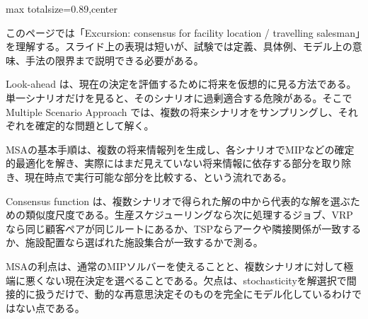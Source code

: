 \begin{minipage}[t]{0.58\textwidth}
\begin{adjustbox}{max totalsize={\textwidth}{0.89\textheight},center}
\begin{minipage}{\textwidth}\scriptsize
{}このページでは「Excursion: consensus for facility location / travelling salesman」を理解する。スライド上の表現は短いが、試験では定義、具体例、モデル上の意味、手法の限界まで説明できる必要がある。\par
Look-ahead は、現在の決定を評価するために将来を仮想的に見る方法である。単一シナリオだけを見ると、そのシナリオに過剰適合する危険がある。そこで Multiple Scenario Approach では、複数の将来シナリオをサンプリングし、それぞれを確定的な問題として解く。\par
MSAの基本手順は、複数の将来情報列を生成し、各シナリオでMIPなどの確定的最適化を解き、実際にはまだ見えていない将来情報に依存する部分を取り除き、現在時点で実行可能な部分を比較する、という流れである。\par
Consensus function は、複数シナリオで得られた解の中から代表的な解を選ぶための類似度尺度である。生産スケジューリングなら次に処理するジョブ、VRPなら同じ顧客ペアが同じルートにあるか、TSPならアークや隣接関係が一致するか、施設配置なら選ばれた施設集合が一致するかで測る。\par
MSAの利点は、通常のMIPソルバーを使えることと、複数シナリオに対して極端に悪くない現在決定を選べることである。欠点は、stochasticityを解選択で間接的に扱うだけで、動的な再意思決定そのものを完全にモデル化しているわけではない点である。\par

\end{minipage}
\end{adjustbox}
\end{minipage}
